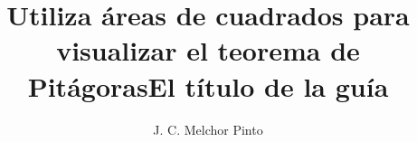 \documentclass[12pt,addpoints,answers]{guia}
\title{Utiliza áreas de cuadrados para visualizar el teorema de Pitágoras}
\title{El título de la guía}
\author{J. C. Melchor Pinto}
\begin{document}
\pagestyle{headandfoot}

\INFO
\printanswers
\vspace{-0.5cm}
\begin{multicols}{2}
    
    
    \columnbreak
    
\end{multicols}
\begin{questions}
    \questionboxed[10]{}
    \questionboxed[10]{}
    \questionboxed[10]{}
    \questionboxed[10]{}
    \questionboxed[10]{}
    \questionboxed[10]{}
    \questionboxed[10]{}
    \questionboxed[10]{}
    \questionboxed[10]{}
\end{questions}
\end{document}
